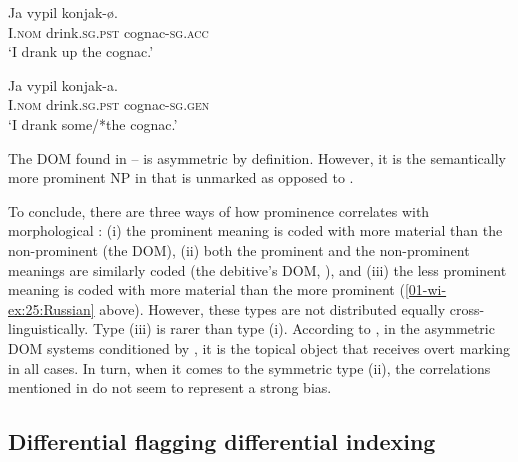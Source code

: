 \documentclass[output=paper]{LSP/langsci}
\begin{document}
\ea\label{01-wi-ex:25:Russian}
\begin{xlist}

\ex\label{01-wi-ex:25a:Russian}
	\gll Ja 	vypil 		konjak-ø.\\
	\textsc{I.nom}	drink.\textsc{sg.pst}	cognac-\textsc{sg.acc}\\
	\glt ‘I drank up the cognac.’

\ex\label{01-wi-ex:25b:Russian}
	\gll Ja 	vypil 		konjak-a.\\
	\textsc{I.nom} drink.\textsc{sg.pst}	cognac-\textsc{sg.gen}\\
	\glt ‘I drank some/*the cognac.’
\end{xlist}
\z

\noindent The DOM found in – is asymmetric by definition. 
However, it is the semantically more prominent NP in   that is unmarked as opposed to .

To conclude, there are three ways of how prominence correlates with morphological : (i) the prominent meaning is coded with more material than the non-prominent (\eg the  DOM), (ii) both the prominent and the non-prominent meanings are similarly coded (\eg the  debitive’s DOM, \citealt{Serzantetal2016Differential}), and (iii) the less prominent meaning is coded with more material than the more prominent (\cf \ref{01-wi-ex:25:Russian} above). 
However, these types are not distributed equally cross-linguistically. 
Type (iii) is rarer than type (i). 
According to \citet[304]{Sinnemki2014Typological}, in the asymmetric DOM systems conditioned by , it is the topical object that receives overt marking in all cases. 
In turn, when it comes to the symmetric type (ii), the correlations mentioned in \citet{Iemmolo2013Symmetric} do not seem to represent a strong bias.


\subsection{Differential flagging \vs differential indexing}
\label{01-wi-sec:3.2-Differential}
\end{document}

